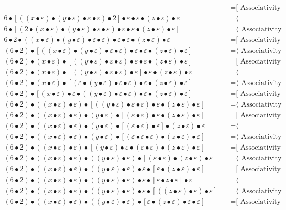 \documentclass{article}
\begin{document}
\begin{align*}
  & \quad \text{=[ Associativity ⟩}\\
6 • [((x • ε) • (y • ε) • ε • ε) • 2] • ε • ε • (z • ε) • ε
  & \quad \text{=⟨ Commutativity ]}\\
6 • [(2 • (x • ε) • (y • ε) • ε • ε) • ε • ε • (z • ε) • ε]
  & \quad \text{=⟨ Associativity ]}\\
6 • 2 • ((x • ε) • (y • ε) • ε • ε) • ε • ε • (z • ε) • ε
  & \quad \text{=[ Associativity ⟩}\\
(6 • 2) • [((x • ε) • (y • ε) • ε • ε) • ε • ε • (z • ε) • ε]
  & \quad \text{=⟨ Associativity ]}\\
(6 • 2) • (x • ε) • [((y • ε) • ε • ε) • ε • ε • (z • ε) • ε]
  & \quad \text{=[ Associativity ⟩}\\
(6 • 2) • (x • ε) • [((y • ε) • ε • ε) • ε] • ε • (z • ε) • ε
  & \quad \text{=⟨ Commutativity ]}\\
(6 • 2) • (x • ε) • [(ε • (y • ε) • ε • ε) • ε • (z • ε) • ε]
  & \quad \text{=⟨ Associativity ]}\\
(6 • 2) • [(x • ε) • ε • ((y • ε) • ε • ε) • ε • (z • ε) • ε]
  & \quad \text{=[ Associativity ⟩}\\
(6 • 2) • ((x • ε) • ε) • [((y • ε) • ε • ε) • ε • (z • ε) • ε]
  & \quad \text{=⟨ Associativity ]}\\
(6 • 2) • ((x • ε) • ε) • (y • ε) • [(ε • ε) • ε • (z • ε) • ε]
  & \quad \text{=[ Associativity ⟩}\\
(6 • 2) • ((x • ε) • ε) • (y • ε) • [(ε • ε) • ε] • (z • ε) • ε
  & \quad \text{=⟨ Commutativity ]}\\
(6 • 2) • ((x • ε) • ε) • (y • ε) • [(ε • ε • ε) • (z • ε) • ε]
  & \quad \text{=⟨ Associativity ]}\\
(6 • 2) • ((x • ε) • ε) • [(y • ε) • ε • (ε • ε) • (z • ε) • ε]
  & \quad \text{=[ Associativity ⟩}\\
(6 • 2) • ((x • ε) • ε) • ((y • ε) • ε) • [(ε • ε) • (z • ε) • ε]
  & \quad \text{=⟨ Associativity ]}\\
(6 • 2) • ((x • ε) • ε) • ((y • ε) • ε) • ε • [ε • (z • ε) • ε]
  & \quad \text{=[ Associativity ⟩}\\
(6 • 2) • ((x • ε) • ε) • ((y • ε) • ε) • ε • [ε • z • ε] • ε
  & \quad \text{=⟨ Commutativity ]}\\
(6 • 2) • ((x • ε) • ε) • ((y • ε) • ε) • ε • [((z • ε) • ε) • ε]
  & \quad \text{=⟨ Associativity ]}\\
(6 • 2) • ((x • ε) • ε) • ((y • ε) • ε) • [ε • (z • ε) • ε • ε]
  & \quad \text{=[ Associativity ⟩}\\

\end{align*}
\end{document}
